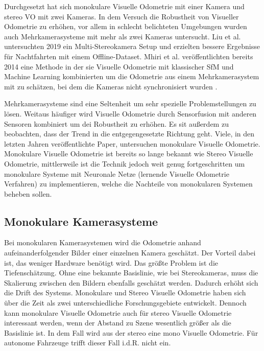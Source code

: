 Durchgesetzt hat sich monokulare Visuelle Odometrie mit einer Kamera und stereo VO mit zwei Kameras. In dem Versuch die Robustheit von Visueller Odometrie zu erhöhen, vor allem in schlecht belichteten Umgebungen wurden auch Mehrkamerasysteme mit mehr als zwei Kameras untersucht. Liu et al. untersuchten 2019 ein Multi-Stereokamera Setup \cite{mulVO_2019} und erzielten bessere Ergebnisse für Nachtfahrten mit einem Offline-Dataset. Mhiri et al. veröffentlichten bereits 2014 eine Methode in der sie Visuelle Odometrie mit klassischer SfM und Machine Learning kombinierten um die Odometrie aus einem Mehrkamerasystem mit zu schätzen, bei dem die Kameras nicht synchronisiert wurden \cite{Mhiri_2014}.

Mehrkamerasysteme sind eine Seltenheit um sehr spezielle Problemstellungen zu lösen. Weitaus häufiger wird Visuelle Odometrie durch Sensorfusion mit anderen Sensoren kombiniert um dei Robustheit zu erhöhen. Es sit au{\ss}erdem zu beobachten, dass der Trend in die entgegengesetzte Richtung geht. Viele, in den letzten Jahren veröffentlichte Paper, untersuchen monokulare Visuelle Odometrie. Monokulare Visuelle Odometrie ist bereits so lange bekannt wie Stereo Visuelle Odometrie, mittlerweile ist die Technik jedoch weit genug fortgeschritten um monokulare Systeme mit Neuronale Netze (lernende Visuelle Odometrie Verfahren) zu implementieren, welche die Nachteile von monokularen Systemen beheben sollen.   

\subsection{Monokulare Kamerasysteme}
Bei monokularen Kamerasystemen wird die Odometrie anhand aufeinanderfolgender Bilder einer einzelnen Kamera geschätzt. Der Vorteil dabei ist, das weniger Hardware benötigt wird. Das grö{\ss}te Problem ist die Tiefenschätzung. Ohne eine bekannte Basislinie, wie bei Stereokameras, muss die Skalierung zwischen den Bildern ebenfalls geschätzt werden. Dadurch erhöht sich die Drift des Systems. Monokulare und Stereo Visuelle Odometrie haben sich über die Zeit als zwei unterschiedliche Forschungsgebiete entwickelt. Dennoch kann monokulare Visuelle Odometrie auch für stereo Visuelle Odometrie interessant werden, wenn der Abstand zu Szene wesentlich grö{\ss}er als die Basislinie ist. In dem Fall wird aus der stereo eine mono Visuelle Odometrie. Für autonome Fahrzeuge trifft dieser Fall i.d.R. nicht ein.   


